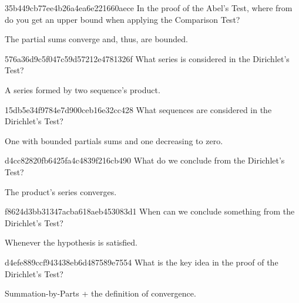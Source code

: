 \begin{note}{35b449cb77ee4b26a4ea6e221660aece}
    In the proof of the Abel's Test, where from do you get an upper bound when applying the Comparison Test?

    \begin{cloze}{1}
        The partial sums converge and, thus, are bounded.
    \end{cloze}
\end{note}

\begin{note}{576a36d9c5f047c59d57212e4781326f}
    What series is considered in the Dirichlet's Test?

    \begin{cloze}{1}
        A series formed by two sequence's product.
    \end{cloze}
\end{note}

\begin{note}{15db5e34f9784e7d900ceb16e32cc428}
    What sequences are considered in the Dirichlet's Test?

    \begin{cloze}{1}
        One with bounded partials sums and one decreasing to zero.
    \end{cloze}
\end{note}

\begin{note}{d4cc82820fb6425fa4c4839f216cb490}
    What do we conclude from the Dirichlet's Test?

    \begin{cloze}{1}
        The product's series converges.
    \end{cloze}
\end{note}

\begin{note}{f8624d3bb31347acba618aeb453083d1}
    When can we conclude something from the Dirichlet's Test?

    \begin{cloze}{1}
        Whenever the hypothesis is satisfied.
    \end{cloze}
\end{note}

\begin{note}{d4efe889ccf943438eb6d487589e7554}
    What is the key idea in the proof of the Dirichlet's Test?

    \begin{cloze}{1}
        Summation-by-Parts + the definition of convergence.
    \end{cloze}
\end{note}

